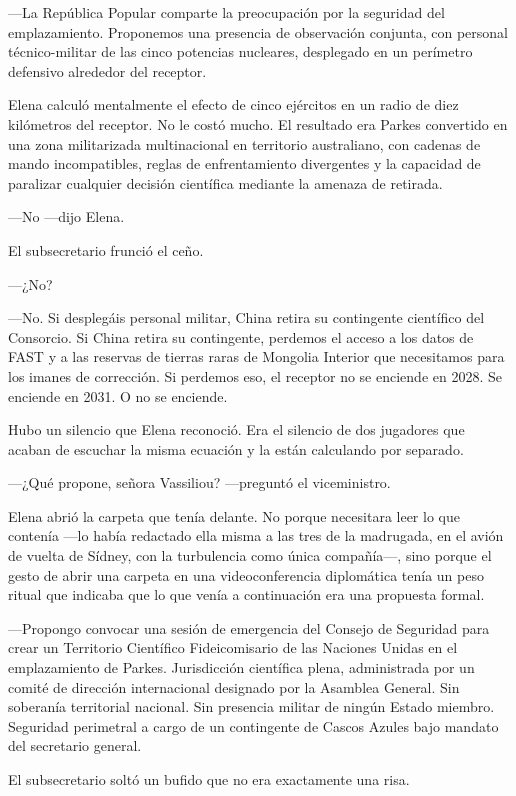 \documentclass[11pt,a5paper,twoside]{book}
\begin{document}
—La República Popular comparte la preocupación por la seguridad del emplazamiento. Proponemos una presencia de observación conjunta, con personal técnico-militar de las cinco potencias nucleares, desplegado en un perímetro defensivo alrededor del receptor.

Elena calculó mentalmente el efecto de cinco ejércitos en un radio de diez kilómetros del receptor. No le costó mucho. El resultado era Parkes convertido en una zona militarizada multinacional en territorio australiano, con cadenas de mando incompatibles, reglas de enfrentamiento divergentes y la capacidad de paralizar cualquier decisión científica mediante la amenaza de retirada.

—No —dijo Elena.

El subsecretario frunció el ceño.

—¿No?

—No. Si desplegáis personal militar, China retira su contingente científico del Consorcio. Si China retira su contingente, perdemos el acceso a los datos de FAST y a las reservas de tierras raras de Mongolia Interior que necesitamos para los imanes de corrección. Si perdemos eso, el receptor no se enciende en 2028. Se enciende en 2031. O no se enciende.

Hubo un silencio que Elena reconoció. Era el silencio de dos jugadores que acaban de escuchar la misma ecuación y la están calculando por separado.

—¿Qué propone, señora Vassiliou? —preguntó el viceministro.

Elena abrió la carpeta que tenía delante. No porque necesitara leer lo que contenía —lo había redactado ella misma a las tres de la madrugada, en el avión de vuelta de Sídney, con la turbulencia como única compañía—, sino porque el gesto de abrir una carpeta en una videoconferencia diplomática tenía un peso ritual que indicaba que lo que venía a continuación era una propuesta formal.

—Propongo convocar una sesión de emergencia del Consejo de Seguridad para crear un Territorio Científico Fideicomisario de las Naciones Unidas en el emplazamiento de Parkes. Jurisdicción científica plena, administrada por un comité de dirección internacional designado por la Asamblea General. Sin soberanía territorial nacional. Sin presencia militar de ningún Estado miembro. Seguridad perimetral a cargo de un contingente de Cascos Azules bajo mandato del secretario general.

El subsecretario soltó un bufido que no era exactamente una risa.
\end{document}
